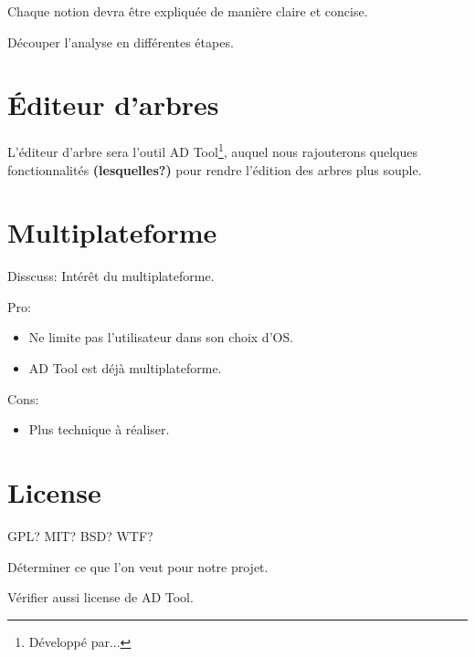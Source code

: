         Chaque notion devra être expliquée de manière claire et concise.
        
        Découper l'analyse en différentes étapes.        
        
    \section{\'Editeur d'arbres}
    	L'éditeur d'arbre sera l'outil AD Tool\footnote{Développé par...}, auquel nous rajouterons quelques fonctionnalités \textbf{(lesquelles?)} pour rendre l'édition des arbres plus souple.
    
    
	\section{Multiplateforme}
        Disscuss: Intérêt du multiplateforme.

    	Pro:
        \begin{itemize}
            \item Ne limite pas l'utilisateur dans son choix d'OS.
            \item AD Tool est déjà multiplateforme.
        \end{itemize}

        Cons:
        \begin{itemize}
        	\item Plus technique à réaliser.
        \end{itemize}

    \section{License}
    	GPL? MIT? BSD? WTF?
        
        Déterminer ce que l'on veut pour notre projet.
        
        Vérifier aussi license de AD Tool.